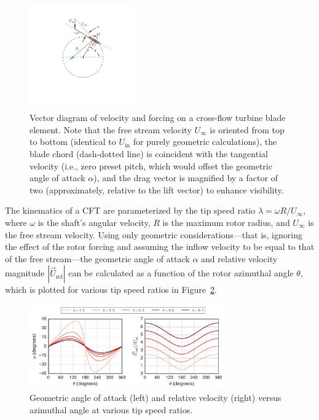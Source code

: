\documentclass[times]{weauth}
\begin{document}
\begin{figure}
    \centering

    \includegraphics[clip, trim=1in 1.5in 1in 0.5in,
    width=0.4\textwidth]{figures/CFT-vectors_cft-vectors}

    \caption{Vector diagram of velocity and forcing on a cross-flow turbine
    blade element. Note that the free stream velocity $U_\infty$ is oriented
    from top to bottom (identical to $U_{\mathrm{in}}$ for purely geometric
    calculations), the blade chord (dash-dotted line) is coincident with the
    tangential velocity (i.e., zero preset pitch, which would offset the
    geometric angle of attack $\alpha$), and the drag vector is magnified by a
    factor of two (approximately, relative to the lift vector) to enhance
    visibility.}

    \label{fig:vectors}
\end{figure}

The kinematics of a CFT are parameterized by the tip speed ratio $\lambda =
\omega R/U_\infty$, where $\omega$ is the shaft's angular velocity, $R$ is the
maximum rotor radius, and $U_\infty$ is the free stream velocity. Using only
geometric considerations---that is, ignoring the effect of the rotor forcing and
assuming the inflow velocity to be equal to that of the free stream---the
geometric angle of attack $\alpha$ and relative velocity magnitude
$|\vec{U}_{\mathrm{rel}}|$ can be calculated as a function of the rotor
azimuthal angle $\theta$, which is plotted for various tip speed ratios in
Figure~\ref{fig:geom-alpha-urel}.

\begin{figure}
    \centering

    \includegraphics[width=0.75\textwidth]{CFT-vectors_alpha_deg_urel_geom}

    \caption{Geometric angle of attack (left) and relative velocity (right)
        versus azimuthal angle at various tip speed ratios.}

    \label{fig:geom-alpha-urel}
\end{figure}
\end{document}
